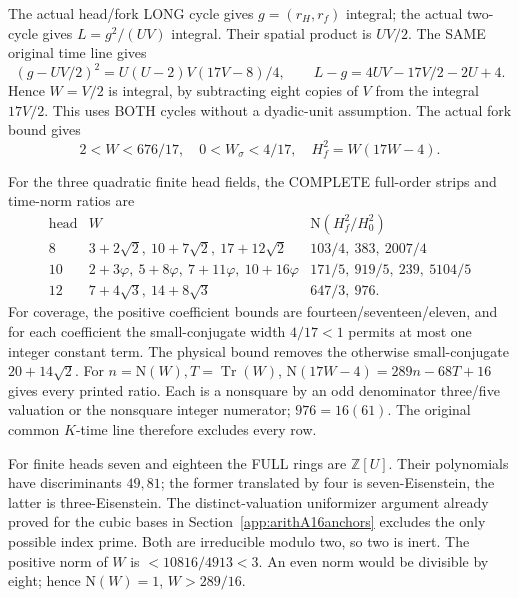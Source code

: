 The actual head/fork LONG cycle gives
\(g=(r_H,r_f)\) integral; the actual two-cycle
gives \(L=g^2/(UV)\) integral.
Their spatial product is \(UV/2\).
The SAME original time line gives
\[
 (g-UV/2)^2=U(U-2)V(17V-8)/4,\qquad
 L-g=4UV-17V/2-2U+4 .
\]
Hence \(W=V/2\) is integral, by subtracting
eight copies of \(V\) from the integral \(17V/2\).
This uses BOTH cycles without a dyadic-unit
assumption.
The actual fork bound gives
\[
                  2<W<676/17,\quad0<W_\sigma<4/17,\quad
                  H_f^2=W(17W-4).
\tag{D17W}\label{eq:arithD17forkstrip}
\]

For the three quadratic finite head fields,
the COMPLETE full-order strips and time-norm
ratios are
\[
\begin{array}{c|l|l}
 \text{head}&W&\mathrm N(H_f^2/H_0^2)\\ \hline
8&
 3+2\sqrt2,\ 10+7\sqrt2,\ 17+12\sqrt2&
 103/4,\ 383,\ 2007/4\\
10&
 2+3\varphi,\ 5+8\varphi,\ 7+11\varphi,\ 10+16\varphi&
 171/5,\ 919/5,\ 239,\ 5104/5\\
12&
 7+4\sqrt3,\ 14+8\sqrt3&
 647/3,\ 976 .
\end{array}
\]
For coverage, the positive coefficient bounds
are fourteen/seventeen/eleven, and for each
coefficient the small-conjugate width \(4/17<1\)
permits at most one integer constant term.
The physical bound removes the otherwise
small-conjugate \(20+14\sqrt2\).
For \(n=\mathrm N(W),T=\operatorname{Tr}(W)\),
\(\mathrm N(17W-4)=289n-68T+16\)
gives every printed ratio.
Each is a nonsquare by an odd denominator
three/five valuation or the nonsquare integer
numerator; \(976=16(61)\).
The original common \(K\)-time line therefore
excludes every row.

For finite heads seven and eighteen the FULL
rings are \(\mathbb Z[U]\).
Their polynomials have discriminants \(49,81\);
the former translated by four is seven-Eisenstein,
the latter is three-Eisenstein.
The distinct-valuation uniformizer argument
already proved for the cubic bases in
Section~\ref{app:arithA16anchors} excludes the
only possible index prime.
Both are irreducible modulo two, so two is inert.
The positive norm of \(W\) is \(<10816/4913<3\).
An even norm would be divisible by eight;
hence \(\mathrm N(W)=1\), \(W>289/16\).

